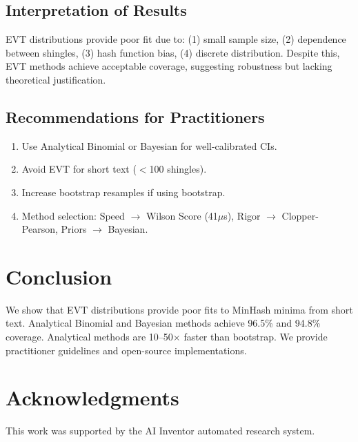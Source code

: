 \documentclass[11pt,letterpaper]{article}
\begin{document}
\subsection{Interpretation of Results}

EVT distributions provide poor fit due to: (1) small sample size, (2) dependence between shingles, (3) hash function bias, (4) discrete distribution. Despite this, EVT methods achieve acceptable coverage, suggesting robustness but lacking theoretical justification.

\subsection{Recommendations for Practitioners}

\begin{enumerate}
    \item Use Analytical Binomial or Bayesian for well-calibrated CIs.
    \item Avoid EVT for short text ($<$100 shingles).
    \item Increase bootstrap resamples if using bootstrap.
    \item Method selection: Speed $\to$ Wilson Score (41$\mu$s), Rigor $\to$ Clopper-Pearson, Priors $\to$ Bayesian.
\end{enumerate}

\section{Conclusion}

We show that EVT distributions provide poor fits to MinHash minima from short text. Analytical Binomial and Bayesian methods achieve 96.5\% and 94.8\% coverage. Analytical methods are 10--50$\times$ faster than bootstrap. We provide practitioner guidelines and open-source implementations.

\section*{Acknowledgments}

This work was supported by the AI Inventor automated research system.



\end{document}
